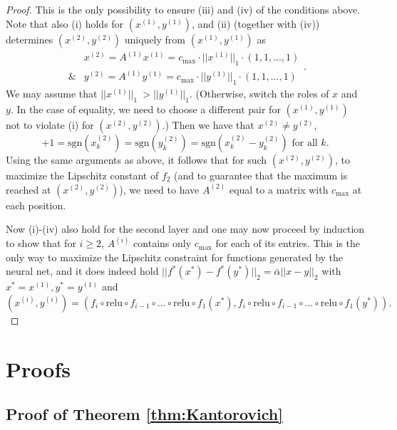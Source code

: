 \documentclass{article} %
\newcommand{\norm}[1]{||{#1}||_2}
\newcommand{\relu}{\text{relu}}
\newcommand{\sgn}[1]{\text{sgn}({#1})}
\begin{document}
\begin{proof}
This is the only possibility to ensure (iii) and (iv) of the conditions above. Note that also (i) holds for $(x^{(1)},y^{(1)})$, and (ii) (together with (iv)) determines $(x^{(2)},y^{(2)})$ uniquely from $(x^{(1)},y^{(1)})$ as
$$\begin{array}{cc} & x^{(2)}=A^{(1)}x^{(1)}=c_{\text{max}}\cdot ||x^{(1)}||_1\cdot  (1,1,...,1)\\
\&& y^{(2)}=A^{(1)}y^{(1)}=c_{\text{max}}\cdot ||y^{(1)}||_1 \cdot (1,1,...,1)\end{array}.$$
We may assume that $||x^{(1)}||_1\ >||y^{(1)}||_1$. (Otherwise, switch the roles of $x$ and $y$. In the case of equality, we need to choose a different pair for $(x^{(1)},y^{(1)})$ not to violate (i) for $(x^{(2)},y^{(2)})$.) Then we have that $x^{(2)}\neq y^{(2)}$, 
$$+1=\sgn{x^{(2)}_k}=\sgn{y^{(2)}_k}=\sgn{x^{(2)}_k-y^{(2)}_k }\text{ for all $k$.}$$
Using the same arguments as above, it follows that for such $(x^{(2)},y^{(2)})$, to maximize the Lipschitz constant of $f_2$ (and to guarantee that the maximum is reached at $(x^{(2)},y^{(2)})$), we need to have $A^{(2)}$ equal to a matrix with $c_{\text{max}}$ at each position. 

Now (i)-(iv) also hold for the second layer and one may now proceed by induction to show that for $i\geq 2$, $A^{(i)}$ contains only $c_{\text{max}}$ for each of its entries. This is the only way to maximize the Lipschitz constraint for functions generated by the neural net, and it does indeed hold $\norm{f^*(x^*)-f^*(y^*)}=\bar{\alpha}\norm{x-y}$ with $x^*=x^{(1)}, y^*=y^{(1)}$ and $$(x^{(i)},y^{(i)})=(f_i\circ \relu \circ f_{i-1}\circ \ldots \circ \relu \circ f_1(x^*), f_i\circ \relu \circ f_{i-1}\circ \ldots \circ \relu \circ f_1(y^*)).$$
\end{proof}


\section{Proofs}

\subsection{Proof of Theorem \ref{thm:Kantorovich}
}\label{appendix:kantorovich}
\end{document}
